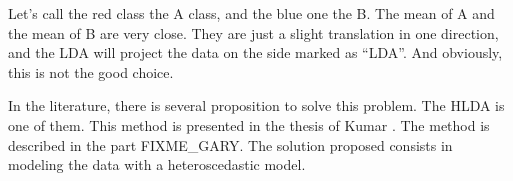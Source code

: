 Let's call the red class the A class, and the blue one the B. The mean
of A and the mean of B are very close. They are just a slight
translation in one direction, and the LDA will project the data on the
side marked as ``LDA''. And obviously, this is not the good choice.

In the literature, there is several proposition to solve this problem.
The HLDA is one of them. This method is presented in the thesis of
Kumar \cite{kumar.1997}. The method is described in the part
FIXME\_GARY. The solution proposed consists in modeling the data with a
heteroscedastic model.

